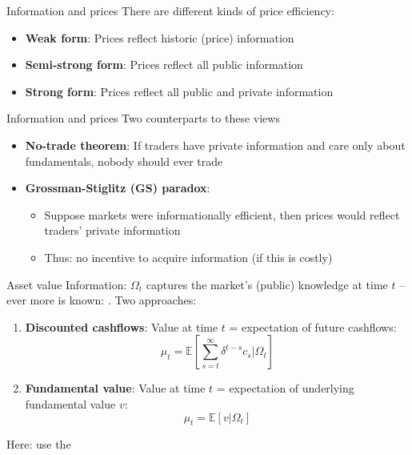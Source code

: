 \documentclass[english,10pt]{beamer}
\begin{document}
\begin{frame}{Information and prices}
	There are different kinds of price efficiency:
	\begin{itemize}
		\item \textbf{Weak form}: Prices reflect historic (price) information
		\item \textbf{Semi-strong form}: Prices reflect all public information
		\item \textbf{Strong form}: Prices reflect all public and private information
	\end{itemize}
\end{frame}


\begin{frame}{Information and prices}
Two counterparts to these views
\begin{itemize}
	\item \textbf{No-trade theorem}: If traders have private information and care only about fundamentals, nobody should ever trade
	\item \textbf{Grossman-Stiglitz (GS) paradox}: 
	\begin{itemize}
		\item Suppose markets were informationally efficient, then prices would reflect traders' private information
		\item Thus: no incentive to acquire information (if this is costly)
	\end{itemize} 
\end{itemize}
\end{frame}


\begin{frame}{Asset value}
	Information: $\Omega_t$ captures the market's (public) knowledge at time $t$ -- ever more is known: 
	. Two approaches:
	\begin{enumerate}
		\item \textbf{Discounted cashflows}: Value at time $t$  = expectation of future cashflows:
		\[
		\mu_t = \mathbb{E}\left[\sum_{s=t}^{\infty} \delta^{t-s} c_s | \Omega_t \right]
		\]
		\item \textbf{Fundamental value}: Value at time $t$ = expectation of underlying fundamental value $v$:
		\[
		\mu_t = \mathbb{E} \left[ v | \Omega_t \right]
		\]
	\end{enumerate}
	Here: use the 
\end{frame}
\end{document}
